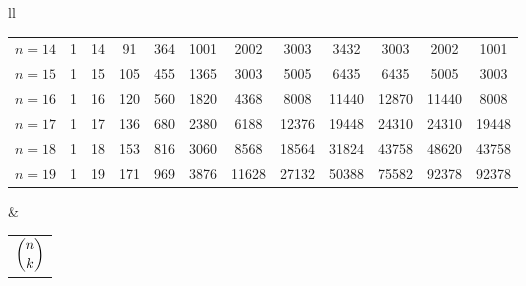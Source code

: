 \begin{tabular}{ll}
\begin{tabular}[t]{l|ccccccccccc}
$n=14$ & 1 & 14 & 91 & 364 & 1001 & 2002 & 3003 & 3432 & 3003 & 2002 & 1001\\
$n=15$ & 1 & 15 & 105 & 455 & 1365 & 3003 & 5005 & 6435 & 6435 & 5005 & 3003\\
\midrule%
$n=16$ & 1 & 16 & 120 & 560 & 1820 & 4368 & 8008 & 11440 & 12870 & 11440 & 8008\\
$n=17$ & 1 & 17 & 136 & 680 & 2380 & 6188 & 12376 & 19448 & 24310 & 24310 & 19448\\
$n=18$ & 1 & 18 & 153 & 816 & 3060 & 8568 & 18564 & 31824 & 43758 & 48620 & 43758\\
$n=19$ & 1 & 19 & 171 & 969 & 3876 & 11628 & 27132 & 50388 & 75582 & 92378 & 92378\\
\bottomrule
\end{tabular}
& \begin{tabular}[t]{l}
\\
$\dbinom{n}{k}$
\end{tabular}
\end{tabular}

